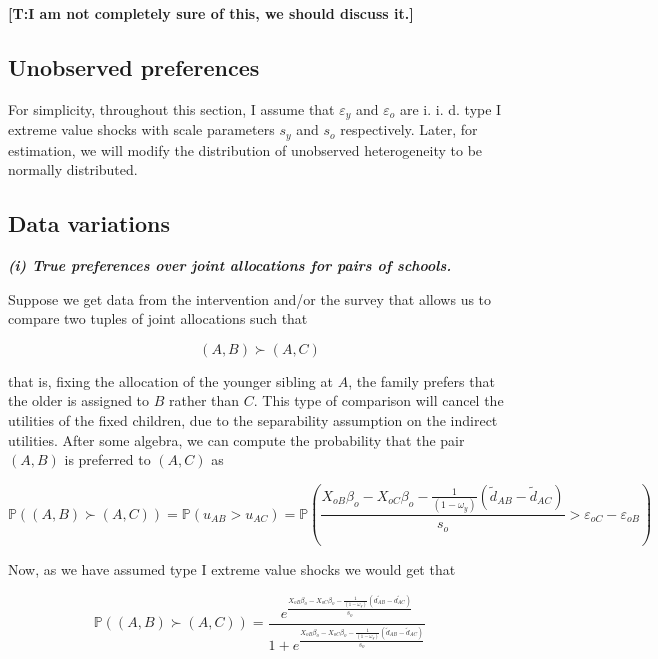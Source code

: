 \documentclass{article}
\newcommand{\tomas}[1]{{\color{red}\textbf{[T:#1]}}}
\begin{document}
\tomas{I am not completely sure of this, we should discuss it.}

\subsection{Unobserved preferences}

For simplicity, throughout this section, I assume that $\varepsilon_y$ and $\varepsilon_o$ are i. i. d. type I extreme value shocks with scale parameters $s_y$ and $s_o$ respectively. Later, for estimation, we will modify the distribution of unobserved heterogeneity to be normally distributed. 

\subsection{Data variations}

\textbf{\textit{(i) True preferences over joint allocations for pairs of schools.}}

Suppose we get data from the intervention and/or the survey that allows us to compare two tuples of joint allocations such that

$$(A, B)  \succ (A,C)$$

that is, fixing the allocation of the younger sibling at $A$, the family prefers that the older is assigned to $B$ rather than $C$. This type of comparison will cancel the utilities of the fixed children, due to the separability assumption on the indirect utilities. After some algebra, we can compute the probability that the pair $(A,B)$ is preferred to $(A,C)$ as

\begin{equation}
    \mathbb{P} \left( (A, B)  \succ (A,C)  \right) =  \mathbb{P} \left( u_{AB} > u_{AC}  \right) = \mathbb{P} \left( \frac{X_{oB}\beta_o - X_{oC}\beta_o - \frac{1}{(1-\omega_y)}\left( \tilde{d}_{AB} - \tilde{d}_{AC}\right)}{s_o} > \varepsilon_{oC} - \varepsilon_{oB} \right) 
\end{equation}

Now, as we have assumed type I extreme value shocks we would get that

\begin{equation}
 \mathbb{P} \left( (A, B)  \succ (A,C)  \right) =  \frac{e^{\frac{X_{oB}\beta_o - X_{oC}\beta_o - \frac{1}{(1 - \omega_y)}\left( \tilde{d_{AB}} - \tilde{d_{AC}}\right)}{s_o}}}{1 + e^{\frac{X_{oB}\beta_o - X_{oC}\beta_o - \frac{1}{(1 - \omega_y)}\left( \tilde{d}_{AB} - \tilde{d}_{AC}\right)}{s_o}}} 
\end{equation}
\end{document}
